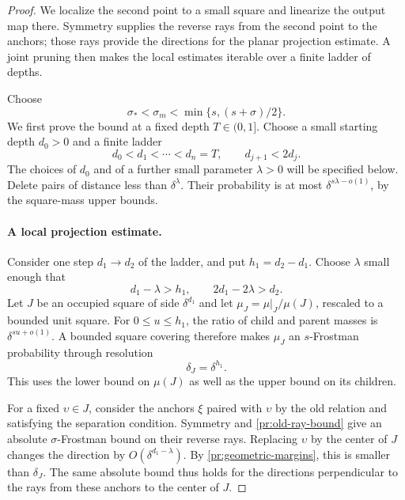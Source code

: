 \begin{proof}
We localize the second point to a small square and linearize the
output map there. Symmetry supplies the reverse rays from the second
point to the anchors; those rays provide the directions for the planar
projection estimate. A joint pruning then makes the local estimates
iterable over a finite ladder of depths.

Choose
\begin{equation}
 \sigma_*<\sigma_m<\min\{s,(s+\sigma)/2\}.
\label{pr:intermediate-exponent}
\end{equation}
We first prove the bound at a fixed depth $T\in(0,1]$.
Choose a small starting depth $d_0>0$ and a finite ladder
\begin{equation}
 d_0<d_1<\cdots<d_n=T,
 \qquad d_{j+1}<2d_j.
\label{pr:ladder}
\end{equation}
The choices of $d_0$ and of a further small parameter $\lambda>0$
will be specified below. Delete pairs of distance less than
$\delta^\lambda$. Their probability is at most
$\delta^{s\lambda-o(1)}$, by the square-mass upper bounds.

\paragraph{A local projection estimate.}
Consider one step $d_1\to d_2$ of the ladder, and put
$h_1=d_2-d_1$. Choose $\lambda$ small enough that
\begin{equation}
 d_1-\lambda>h_1,
 \qquad 2d_1-2\lambda>d_2.
\label{pr:geometric-margins}
\end{equation}
Let $J$ be an occupied square of side $\delta^{d_1}$ and let
$\mu_J=\mu|_J/\mu(J)$, rescaled to a bounded unit square.
For $0\le u\le h_1$, the ratio of child and parent masses is
$\delta^{su+o(1)}$. A bounded square covering therefore makes
$\mu_J$ an $s$-Frostman probability through resolution
\[
 \delta_J=\delta^{h_1}.
\]
This uses the lower bound on $\mu(J)$ as well as the upper bound on
its children.

For a fixed $\upsilon\in J$, consider the anchors $\xi$ paired
with $\upsilon$ by the old relation and satisfying the separation
condition. Symmetry and \eqref{pr:old-ray-bound} give an absolute
$\sigma$-Frostman bound on their reverse rays.
Replacing $\upsilon$ by the center of $J$ changes the direction by
$O(\delta^{d_1-\lambda})$. By
\eqref{pr:geometric-margins}, this is smaller than $\delta_J$.
The same absolute bound thus holds for the directions perpendicular
to the rays from these anchors to the center of $J$.


\end{proof}
